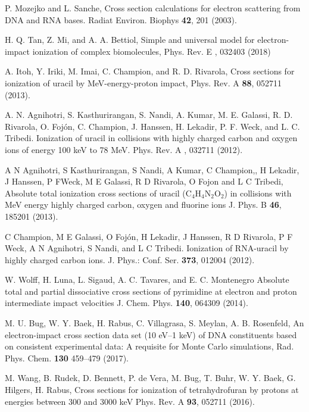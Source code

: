 \documentclass[preprint,12pt]{article}
\begin{document}
\begin{thebibliography}{99}
P. Mozejko and L. Sanche, 
Cross section calculations for electron scattering from DNA and RNA bases.
Radiat Environ. Biophys \textbf{42}, 201 (2003).

H. Q. Tan, Z. Mi, and A. A. Bettiol, 
Simple and universal model for electron-impact ionization of complex biomolecules, 
Phys. Rev. E , 032403 (2018)

A. Itoh, Y. Iriki, M. Imai, C. Champion, and R. D. Rivarola, 
Cross sections for ionization of uracil by MeV-energy-proton impact, 
Phys. Rev. A \textbf{88}, 052711 (2013).


A. N. Agnihotri, S. Kasthurirangan, S. Nandi, A.
Kumar, M. E. Galassi, R. D. Rivarola, O. Foj\'{o}n, C. Champion, J. Hanssen,
H. Lekadir, P. F. Weck, and L. C. Tribedi. 
Ionization of uracil in collisions with highly charged carbon and oxygen 
ions of energy 100 keV to 78 MeV. 
Phys. Rev. A , 032711 (2012).

A N Agnihotri, S Kasthurirangan, S Nandi, A Kumar, C Champion,, H Lekadir, 
J Hanssen, P FWeck, M E Galassi, R D Rivarola, O Fojon and L C Tribedi, 
Absolute total ionization cross sections of uracil (C$_4$H$_4$N$_2$O$_2$) in 
collisions with MeV energy highly charged carbon, oxygen and fluorine ions
J. Phys. B \textbf{46}, 185201 (2013).

C Champion, M E Galassi, O Foj\'{o}n, H Lekadir, J Hanssen, R D Rivarola,
P F Weck, A N Agnihotri, S Nandi, and L C Tribedi. 
Ionization of RNA-uracil by highly charged carbon ions.
J. Phys.: Conf. Ser. \textbf{373}, 012004 (2012).

W. Wolff, H. Luna, L. Sigaud, A. C. Tavares, and E. C. Montenegro
Absolute total and partial dissociative cross sections of pyrimidine
at electron and proton intermediate impact velocities
J. Chem. Phys. \textbf{140}, 064309 (2014).

M. U. Bug, W. Y. Baek, H. Rabus, C. Villagrasa, S. Meylan, A. B. Rosenfeld,
An electron-impact cross section data set (10 eV--1 keV) of DNA
constituents based on consistent experimental data: A requisite for 
Monte Carlo simulations,
Rad. Phys. Chem. \textbf{130} 459--479 (2017).

M. Wang, B. Rudek, D. Bennett, P. de Vera, M. Bug, T. Buhr, W. Y. Baek, 
G. Hilgers, H. Rabus, 
Cross sections for ionization of tetrahydrofuran by protons at energies 
between 300 and 3000 keV
Phys. Rev. A \textbf{93}, 052711 (2016).


\end{thebibliography}
\end{document}
